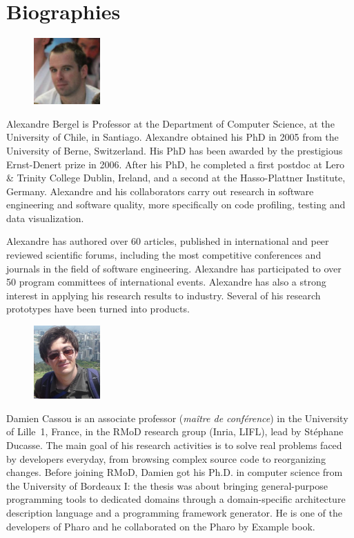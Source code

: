 \documentclass[a4paper,10pt,twoside]{book}
\begin{document}
	\sloppy
	\frontmatter
\fi
\chapter{Biographies}

\begin{figure}
\centering
\includegraphics[width=1in]{alexandre}
\end{figure}

Alexandre Bergel is Professor at the Department of Computer Science, at the University of Chile, in Santiago.
Alexandre obtained his PhD in 2005 from the University of Berne, Switzerland. His PhD has been awarded by the prestigious Ernst-Denert prize in 2006. After his PhD, he completed a first postdoc at Lero \& Trinity College Dublin, Ireland, and a second at the Hasso-Plattner Institute, Germany. Alexandre and his collaborators carry out research in software engineering and software quality, more specifically on code profiling, testing and data visualization.

Alexandre has authored over 60 articles, published in international and peer reviewed scientific forums, including the most competitive conferences and journals in the field of software engineering. Alexandre has participated to over 50 program committees of international events. Alexandre has also a strong interest in applying his research results to industry. Several of his research prototypes have been turned into products.


\begin{figure}
\centering
\includegraphics[width=1in]{damien}
\end{figure}
Damien Cassou is an associate professor (\textit{ma\^itre de
  conf\'erence}) in the University of Lille~1, France, in the RMoD
research group (Inria, LIFL), lead by St\'ephane Ducasse. The main
goal of his research activities is to solve real problems faced by
developers everyday, from browsing complex source code to reorganizing
changes. Before joining RMoD, Damien got his Ph.D. in computer science
from the University of Bordeaux I: the thesis was about bringing
general-purpose programming tools to dedicated domains through a
domain-specific architecture description language and a programming
framework generator. He is one of the developers of Pharo and he
collaborated on the Pharo by Example book.
\end{document}
